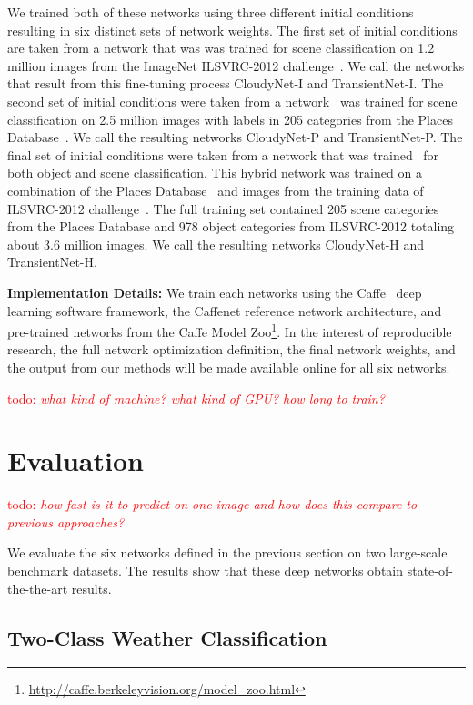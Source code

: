 \documentclass{article}
\newcommand{\todo}[1]{\textcolor{red}{todo: {\em #1}}}
\begin{document}
We trained both of these networks using three different initial
conditions resulting in six distinct sets of network weights. The
first set of initial conditions are taken from a network that was was
trained for scene classification on 1.2 million images from the
ImageNet ILSVRC-2012 challenge~\cite{ILSVRCarxiv14}.  We call the
networks that result from this fine-tuning process CloudyNet-I and
TransientNet-I.  The second set of initial conditions were taken from
a network~\cite{zhou2014places} was trained for scene classification
on 2.5 million images with labels in 205 categories from the Places
Database~\cite{zhou2014places}. We call the resulting networks
CloudyNet-P and TransientNet-P.  The final set of initial conditions
were taken from a network that was trained~\cite{zhou2014places} for
both object and scene classification.  This hybrid network was trained
on a combination of the Places Database~\cite{zhou2014places} and
images from the training data of ILSVRC-2012
challenge~\cite{ILSVRCarxiv14}.  The full training set contained 205
scene categories from the Places Database and 978 object categories
from ILSVRC-2012 totaling about 3.6 million images.  We call the
resulting networks CloudyNet-H and TransientNet-H.

\textbf{Implementation Details:} We train each networks using the
Caffe~\cite{caffe14} deep learning software framework, the Caffenet
reference network architecture, and pre-trained networks from the
Caffe Model
Zoo\footnote{\url{http://caffe.berkeleyvision.org/model_zoo.html}}.
In the interest of reproducible research, the full network
optimization definition, the final network weights, and the output
from our methods will be made available online for all six networks.

\todo{what kind of machine? what kind of GPU? how long to train?}

\section{Evaluation}

\todo{how fast is it to predict on one image and how does this compare
to previous approaches?}

We evaluate the six networks defined in the previous section on two
large-scale benchmark datasets. The results show that these deep
networks obtain state-of-the-the-art results. 

\subsection{Two-Class Weather Classification}
\end{document}

